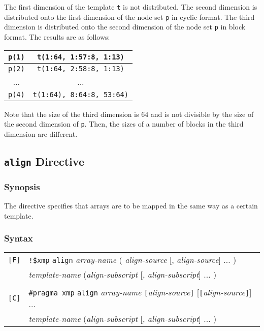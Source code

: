 \begin{description}
The first dimension of the template {\tt t} is not distributed. The
second dimension is distributed onto the first dimension of the node set
{\tt p} in cyclic format. The third dimension is distributed onto the
second dimension of the node set {\tt p} in block format. The results
are as follows:

\begin{center}
\begin{tabular}{|c|c|}
\hline
{\tt p(1)} & {\tt t(1:64, 1:57:8, 1:13)} \\
\hline
{\tt p(2)} & {\tt t(1:64, 2:58:8, 1:13)} \\
\hline
... & ... \\
\hline
{\tt p(4)} & {\tt t(1:64), 8:64:8, 53:64)} \\
\hline
\end{tabular}
\end{center}

Note that the size of the third dimension is 64 and is not divisible by
the size of the second dimension of {\tt p}. Then, the sizes of a number
of blocks in the third dimension are different.

\end{description}

\subsection{{\tt align} Directive}

\subsubsection*{Synopsis}
The {\tt {}} directive specifies that arrays are to be
mapped in the same way as a certain template.

\subsubsection*{Syntax}

\begin{tabular}{ll}
\verb![F]! & \verb|!$xmp| {\tt align} {\it array-name}
( {\it align-source} [, {\it align-source}] ... ) \\
 & \hspace{3cm}{\tt with} {\it template-name}
({\it align-subscript} [, {\it align-subscript}] ... ) \\
 & \\
\verb![C]! & \verb|#pragma xmp| {\tt align} {\it array-name} 
{\tt [}{\it align-source}{\tt ]} [{\tt [}{\it align-source}{\tt ]}] ... \\
 & \hspace{3cm}{\tt with} {\it template-name}
({\it align-subscript} [, {\it align-subscript}] ... ) \\
\end{tabular}
\vspace{0.3cm}

